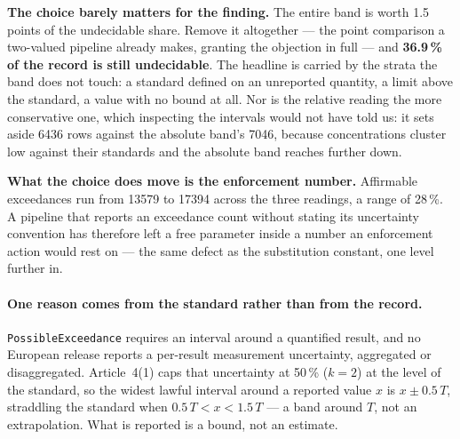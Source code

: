 \textbf{The choice barely matters for the finding.} The entire band is worth
\num{1.5} points of the undecidable share. Remove it altogether --- the point
comparison a two-valued pipeline already makes, granting the objection in full
--- and \textbf{\num{36.9}\,\% of the record is still undecidable}. The
headline is carried by the strata the band does not touch: a standard defined
on an unreported quantity, a limit above the standard, a value with no bound at
all. Nor is the relative reading the more conservative one, which inspecting
the intervals would not have told us: it sets aside \num{6436} rows against
the absolute band's \num{7046}, because concentrations cluster low against
their standards and the absolute band reaches further down.

\textbf{What the choice does move is the enforcement number.} Affirmable
exceedances run from \num{13579} to \num{17394} across the three readings, a
range of \num{28}\,\%. A pipeline that reports an exceedance count without
stating its uncertainty convention has therefore left a free parameter inside a
number an enforcement action would rest on --- the same defect as the
substitution constant, one level further in.

\paragraph{One reason comes from the standard rather than from the record.}
\texttt{PossibleExceedance} requires an interval around a quantified result,
and no European release reports a per-result measurement uncertainty,
aggregated or disaggregated. Article~4(1) caps that uncertainty at
\num{50}\,\% ($k=2$) at the level of the standard, so the widest lawful
interval around a reported value $x$ is $x \pm 0.5\,T$, straddling the
standard when $0.5\,T < x < 1.5\,T$ --- a band around $T$, not an
extrapolation. What is reported is a bound, not an estimate.

